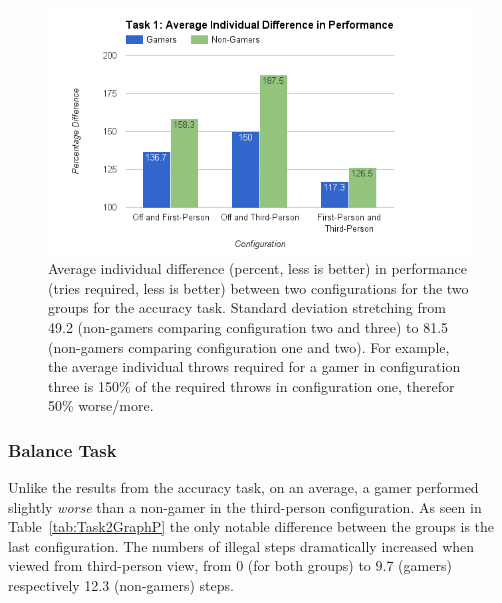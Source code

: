 \documentclass[runningheads,a4paper,oribibl]{llncs}
\begin{document}
\begin{figure}
   \centering
   \includegraphics[width=\textwidth]{ExternalMaterial/Task1GraphD}
   \caption{Average individual difference (percent, less is better) in performance (tries required, less is better) between two configurations for the two groups for the accuracy task. Standard deviation stretching from 49.2 (non-gamers comparing configuration two and three) to 81.5 (non-gamers comparing configuration one and two). For example, the average individual throws required for a gamer in configuration three is 150\% of the required throws in configuration one, therefor 50\% worse/more.} \label{fig:Task1GraphD}
\end{figure}












\subsubsection{Balance Task}
Unlike the results from the accuracy task, on an average, a gamer performed slightly \emph{worse} than a non-gamer in the third-person configuration. As seen in Table~\ref{tab:Task2GraphP} the only notable difference between the groups is the last configuration. The numbers of illegal steps dramatically increased when viewed from third-person view, from 0 (for both groups) to 9.7 (gamers) respectively 12.3 (non-gamers) steps.  
\end{document}
